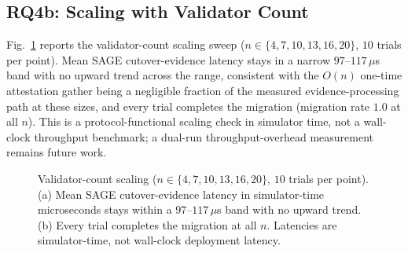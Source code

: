 \documentclass[journal]{IEEEtran}
\theoremstyle{remark}
\begin{document}
\subsection{RQ4b: Scaling with Validator Count}
Fig.~\ref{fig:scaling} reports the validator-count scaling sweep
($n\in\{4,7,10,13,16,20\}$, $10$ trials per point). Mean
SAGE cutover-evidence latency stays in a narrow $97$--$117\,\mu$s band with no upward trend across
the range, consistent with the $O(n)$ one-time attestation gather being a negligible fraction of
the measured evidence-processing path at these sizes, and every trial completes the migration
(migration rate $1.0$ at all $n$). This is a protocol-functional scaling check in simulator time,
not a wall-clock throughput benchmark; a dual-run throughput-overhead measurement
remains future work.

\begin{figure}[t]
\centering
{}
\caption{Validator-count scaling ($n\in\{4,7,10,13,16,20\}$, $10$ trials per point).
(a) Mean SAGE cutover-evidence latency in simulator-time microseconds stays within a $97$--$117\,\mu$s
band with no upward trend. (b) Every trial completes the migration at all $n$. Latencies are
simulator-time, not wall-clock deployment latency.}
\label{fig:scaling}
\end{figure}
\end{document}
